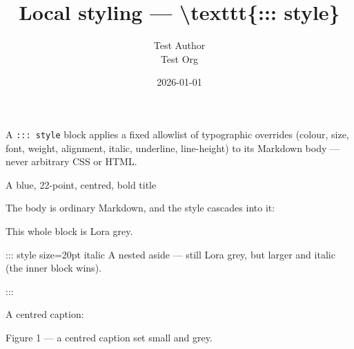 \documentclass[11pt,a4paper]{article}
\title{Local styling — \textbackslash{}texttt\{::: style\}}
\author{Test Author \\ Test Org}
\date{2026-01-01}
\theoremstyle{definition}
\begin{document}
\maketitle

A \texttt{::: style} block applies a fixed allowlist of typographic overrides
(colour, size, font, weight, alignment, italic, underline, line-height)
to its Markdown body — never arbitrary CSS or HTML.


\begin{tcolorbox}[breakable, colback=gray!5, colframe=gray!50, title=Style]
A blue, 22-point, centred, bold title
\end{tcolorbox}


The body is ordinary Markdown, and the style cascades into it:


\begin{tcolorbox}[breakable, colback=gray!5, colframe=gray!50, title=Style]
This whole block is Lora grey.


::: style size=20pt italic
A nested aside — still Lora grey, but larger and italic (the inner
block wins).
\end{tcolorbox}

:::


A centred caption:


\begin{tcolorbox}[breakable, colback=gray!5, colframe=gray!50, title=Style]
Figure 1 — a centred caption set small and grey.
\end{tcolorbox}
\end{document}
